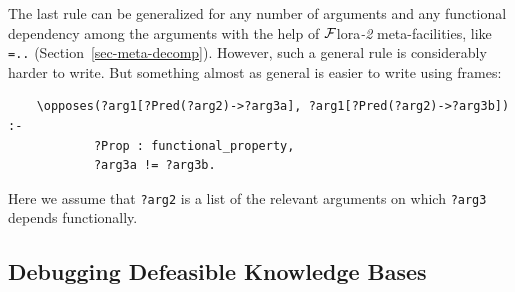 \documentclass[11pt]{article}
\newcommand{\FLORA}{{\mbox{\sc ${\cal F}${lora}\rm\emph{-2}}}\xspace}
\newcommand{\FLSYSTEM}{\FLORA}
\begin{document}
The last rule can be generalized for any number of arguments and any
functional dependency among the arguments with the help of \FLSYSTEM
meta-facilities, like \verb|=..| (Section~\ref{sec-meta-decomp}).
However, such a general rule is considerably harder to write.
But something almost as general is easier to write using frames:
\begin{verbatim}
    \opposes(?arg1[?Pred(?arg2)->?arg3a], ?arg1[?Pred(?arg2)->?arg3b]) :-
            ?Prop : functional_property,
            ?arg3a != ?arg3b.
\end{verbatim}
Here we assume that \texttt{?arg2} is a list of the relevant arguments on
which \texttt{?arg3} depends functionally.  




\subsection{Debugging Defeasible Knowledge Bases}
\label{sec-debugging-defeat}
\end{document}
